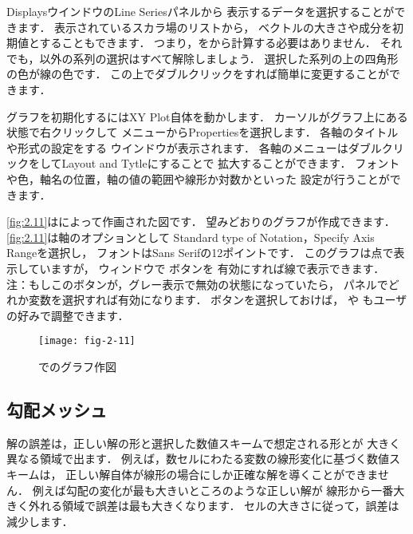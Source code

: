DisplaysウインドウのLine Seriesパネルから
表示するデータを選択することができます．
表示されているスカラ場のリストから，
ベクトルの大きさや成分を初期値とすることもできます．
つまり，をから計算する必要はありません．
それでも，以外の系列の選択はすべて解除しましょう．
選択した系列の上の四角形の色が線の色です．
この上でダブルクリックをすれば簡単に変更することができます．

グラフを初期化するにはXY Plot自体を動かします．
カーソルがグラフ上にある状態で右クリックして
メニューからPropertiesを選択します．
各軸のタイトルや形式の設定をする
%
%
ウインドウが表示されます．
各軸のメニューはダブルクリックをしてLayout and Tytleにすることで
拡大することができます．
フォントや色，軸名の位置，軸の値の範囲や線形か対数かといった
設定が行うことができます．

\autoref{fig:2.11}はによって作画された図です．
望みどおりのグラフが作成できます．
\autoref{fig:2.11}は軸のオプションとして
Standard type of Notation，Specify Axis Rangeを選択し，
フォントはSans Serifの12ポイントです．
このグラフは点で表示していますが，
ウィンドウで
%
%
ボタンを
有効にすれば線で表示できます．
注：もしこのボタンが，グレー表示で無効の状態になっていたら，
パネルでどれか変数を選択すれば有効になります．
ボタンを選択しておけば，
%
%
や
%
%
もユーザの好みで調整できます．


\begin{figure}[ht]
 \texttt{[image: fig-2-11]}
 \caption{でのグラフ作図}
 \label{fig:2.11}
\end{figure}


\subsection{勾配メッシュ}
\label{ssec:2.1.6}
解の誤差は，正しい解の形と選択した数値スキームで想定される形とが
大きく異なる領域で出ます．
例えば，数セルにわたる変数の線形変化に基づく数値スキームは，
正しい解自体が線形の場合にしか正確な解を導くことができません．
例えば勾配の変化が最も大きいところのような正しい解が
線形から一番大きく外れる領域で誤差は最も大きくなります．
セルの大きさに従って，誤差は減少します．

